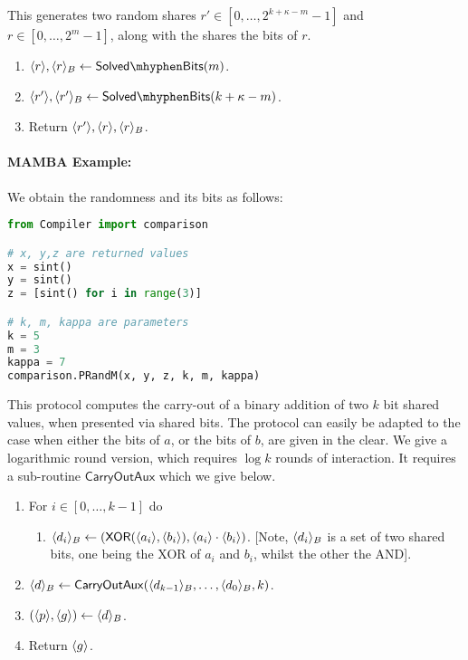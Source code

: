 This generates two random shares $r' \in [0,\ldots,2^{k+\kappa-m}-1]$
and $r \in [0,\ldots,2^m-1]$, along with the shares the bits of $r$.
\begin{enumerate}
\item $\sshare{r}, \sshare{r}_B \asn \mathsf{Solved\mhyphen Bits}(m)$.
\item $\sshare{r'}, \sshare{r'}_B \asn \mathsf{Solved\mhyphen Bits}(k+\kappa-m)$.
\item Return $\langle r' \rangle, \langle r \rangle, \langle r \rangle_B$.
\end{enumerate}
\paragraph{MAMBA Example:}  We obtain the randomness and its bits as follows: 
\begin{lstlisting}[language={python}]
from Compiler import comparison

# x, y,z are returned values
x = sint()
y = sint()
z = [sint() for i in range(3)]

# k, m, kappa are parameters
k = 5
m = 3
kappa = 7
comparison.PRandM(x, y, z, k, m, kappa)
\end{lstlisting}
This protocol computes the carry-out of a binary addition of
two $k$ bit shared values, when presented via shared bits.
The protocol can easily be adapted to the case when either
the bits of $a$, or the bits of $b$, are given in the clear.
We give a logarithmic round version, which requires $\log k$
rounds of interaction.
It requires a sub-routine $\mathsf{CarryOutAux}$ which we
give below.
\begin{enumerate}
\item For $i \in [0,\ldots,k-1]$ do
\begin{enumerate}
\item $\langle d_i \rangle_B \leftarrow (\mathsf{XOR}(\langle a_i \rangle,\langle b_i \rangle),
	                    \langle a_i \rangle\cdot \langle b_i \rangle)$.
      [Note, $\langle d_i \rangle_B$ is a set of two shared bits, one being the XOR
      of $a_i$ and $b_i$, whilst the other the AND].
\end{enumerate}
\item $\langle d \rangle_B \leftarrow \mathsf{CarryOutAux}(\langle d_{k-1} \rangle_B,\ldots,\langle d_0 \rangle_B,k)$.
\item $(\langle p \rangle,\langle g \rangle) \leftarrow \langle d \rangle_B$.
\item Return $\langle g \rangle$.
\end{enumerate}

